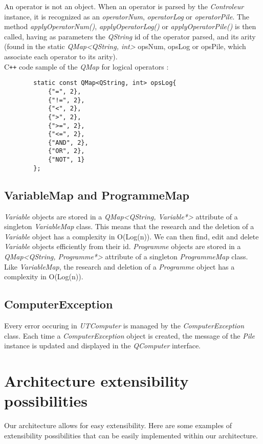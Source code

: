 \documentclass[titlepage]{article}
\begin{document}
    An operator is not an object. When an operator is parsed by the \textit{Controleur} instance, it is recognized as an \textit{operatorNum}, \textit{operatorLog} or \textit{operatorPile}. The method \textit{applyOperatorNum()}, \textit{applyOperatorLog()} or \textit{applyOperatorPile()} is then called, having as parameters the \textit{QString} id of the operator parsed, and its arity (found in the static \textit{QMap<QString, int>} opsNum, opsLog or opsPile, which associate each operator to its arity).\\

    C\texttt{++} code sample of the \textit{QMap} for logical operators :
    \begin{lstlisting}
        static const QMap<QString, int> opsLog{
            {"=", 2},
            {"!=", 2},
            {"<", 2},
            {">", 2},
            {">=", 2},
            {"<=", 2},
            {"AND", 2},
            {"OR", 2},
            {"NOT", 1}
        };
    \end{lstlisting}

    \subsection{VariableMap and ProgrammeMap}

    \textit{Variable} objects are stored in a \textit{QMap<QString, Variable*>} attribute of a singleton \textit{VariableMap} class. This means that the research and the deletion of a \textit{Variable} object has a complexity in O(Log(n)). We can then find, edit and delete \textit{Variable} objects efficiently from their id.
    \textit{Programme} objects are stored in a \textit{QMap<QString, Programme*>} attribute of a singleton \textit{ProgrammeMap} class. Like \textit{VariableMap}, the research and deletion of a \textit{Programme} object has a complexity in O(Log(n)).

    \subsection{ComputerException}

    Every error occuring in \textit{UTComputer} is managed by the \textit{ComputerException} class. Each time a \textit{ComputerException} object is created, the message of the \textit{Pile} instance is updated and displayed in the \textit{QComputer} interface.

\newpage
\section{Architecture extensibility possibilities}
	Our architecture allows for easy extensibility. Here are some examples of extensibility possibilities that can be easily implemented within our architecture.
\end{document}
